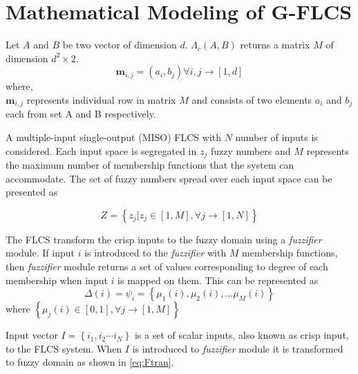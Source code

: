\section{Mathematical Modeling of G\hyp{}FLCS} \label{sec:ch2-mathmod}

\begin{Lemma}\label{lem:VecComb} 
	Let $ A $ and $ B $ be two vector of dimension $ d $. 
$ \Lambda_c (A,B)$ returns a matrix $ M $ of dimension $ d^2\times2 $. 
\[{\textbf{m}_{i,j}} = \left( {{a_i},{b_j}} \right)\forall i,j \to [1,d]\]
where,\\
$ {\textbf{m}_{i,j}} $ represents individual row in matrix $ M $ and consists of two elements $ a_i $ and $ b_j $ each from set A and B respectively. 
\end{Lemma} 

A multiple-input single-output (MISO) FLCS with $ N $ number of inputs is considered. Each input space is segregated in $ z_j $ fuzzy numbers and $ M $ represents the maximum number of membership functions that the system can accommodate. The set of fuzzy numbers spread over each input space can be presented as

\[Z = \left\{ {{z_j}|{z_j} \in [1,M],\forall j \to \left[ {1,N} \right]} \right\}\]

The FLCS transform the crisp inputs to the fuzzy domain using a \textit{fuzzifier} module. If input $ i $ is introduced to the \textit{fuzzifier} with $ M $ membership functions, then \textit{fuzzifier} module returns a set of values corresponding to degree of each membership when input $ i $ is mapped on them. This can be represented as 
\begin{equation} \label{eq:gamma}
\Delta  \left( i \right) = \psi _i  = \left\{ {\mu _1 \left( i \right),\mu _2 \left( i \right), \ldots \mu _M \left( i \right)} \right\}
\end{equation}
where $ \left\{ {{\mu _j}\left( i \right) \in \left[ {0,1} \right],\forall j \to [1,M]} \right\} $
\par		
Input vector $ I = \left \{ i_{1}, i_{2} \cdots i_{N}\right \} $ is a set of scalar inputs, also known as crisp input, to the FLCS system. When $ I $ is introduced to \textit{fuzzifier} module it is transformed to fuzzy domain as shown in \eqref{eq:Ftran}. 

